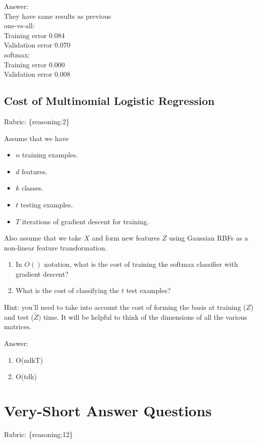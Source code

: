 \documentclass{article}
\def\rubric#1{\gre{Rubric: \{#1\}}}{}
\def\ans#1{\par\gre{Answer: #1}}
\def\blu#1{{\color{blu}#1}}
\def\gre#1{{\color{gre}#1}}
\def\items#1{\begin{itemize}#1\end{itemize}}
\def\enum#1{\begin{enumerate}#1\end{enumerate}}
\begin{document}
\ans{\\
	They have same results as previous\\
	one-vs-all: \\
	Training error 0.084\\
	Validation error 0.070\\
	softmax: \\
Training error 0.000\\
Validation error 0.008}

\subsection{Cost of Multinomial Logistic Regression}
\rubric{reasoning:2}

Assume that we have
\items{
\item $n$ training examples.
\item $d$ features.
\item $k$ classes.
\item $t$ testing examples.
\item $T$ iterations of gradient descent for training.
}
Also assume that we take $X$ and form new features $Z$ using Gaussian RBFs as a non-linear feature transformation.
\blu{\enum{
\item In $O()$ notation, what is the cost of training the softmax classifier with gradient descent?
\item What is the cost of classifying the $t$ test examples?
}
}
Hint: you'll need to take into account the cost of forming the basis at training ($Z$) and test ($\tilde{Z})$ time. It will be helpful to think of the dimensions of all the various matrices.

\ans{
	\enum{
		\item {
			O(ndkT)
		}
	\item {
		O(tdk)
	}
	}
}



\section{Very-Short Answer Questions}
\rubric{reasoning:12}
\end{document}

